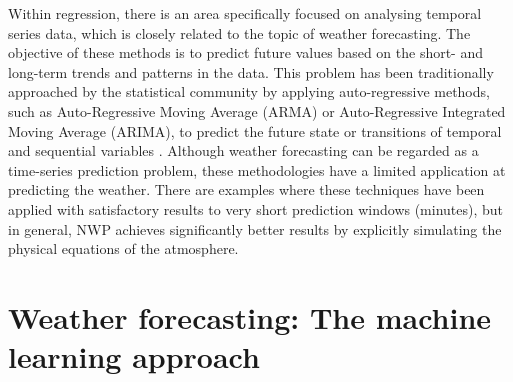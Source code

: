 \bigskip
\bigskip


\bigskip
\bigskip

Within regression, there is an area specifically focused on analysing temporal series data, which is closely related to the topic of weather forecasting. The objective of these methods is to predict future values based on the short- and long-term trends and patterns in the data. This problem has been traditionally approached by the statistical community by applying auto-regressive methods, such as Auto-Regressive Moving Average (ARMA) or Auto-Regressive Integrated Moving Average (ARIMA), to predict the future state or transitions of temporal and sequential variables \citep{stram1986temporal,zhang2003time}. Although weather forecasting can be regarded as a time-series prediction problem, these methodologies have a limited application at predicting the weather. There are examples \citep{hodge2011improved,eldali2016employing} where these techniques have been applied with satisfactory results to very short prediction windows (minutes), but in general, NWP achieves significantly better results by explicitly simulating the physical equations of the atmosphere.

\medskip

\medskip











\section{Weather forecasting: The machine learning approach}


